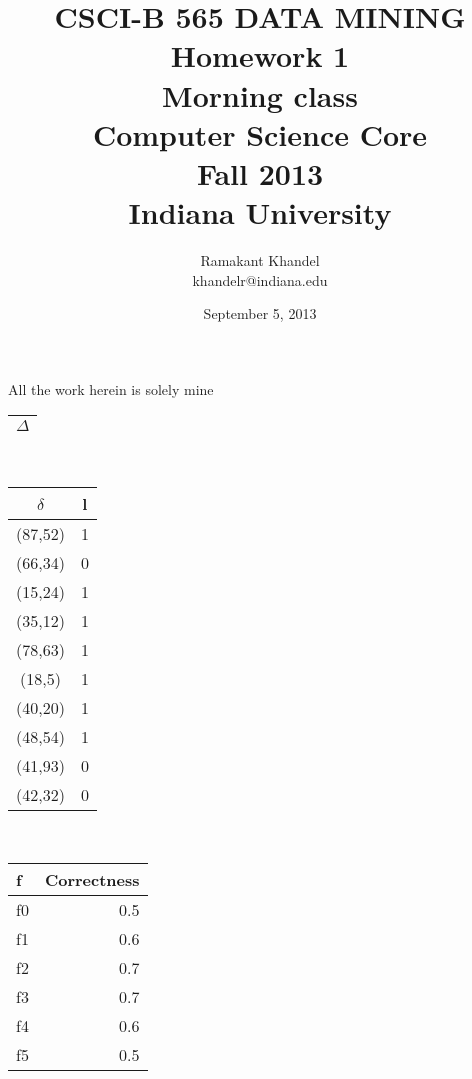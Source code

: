 \documentclass{article}
\title{ CSCI-B 565 DATA MINING\\
Homework 1\\
Morning class\\
Computer Science Core \\ Fall 2013 \\ Indiana University}
\author{ Ramakant Khandel \\ khandelr@indiana.edu\\}
\date {September 5, 2013}
\begin{document}
\maketitle
\begin{center}
All the work herein is solely mine
\\
\begin{tabular}{|c|}
\hline
$\Delta$ \\
\hline
\end{tabular}
\\
\begin{tabular}{c|c}
\hline
$\delta$ & l \\
\hline
(87,52) &1\\
(66,34) &0\\
(15,24) &1\\
(35,12) &1\\
(78,63) &1\\
(18,5) &1\\
(40,20) &1\\
(48,54) &1\\
(41,93) &0\\
(42,32) &0\\
\hline
\end{tabular}
\\
\begin{tabular}{|l r|}
\hline
f & Correctness \\
\hline
f0&0.5\\
f1&0.6\\
f2&0.7\\
f3&0.7\\
f4&0.6\\
f5&0.5\\
\hline
\end{tabular}
\end{center}
\end{document}
